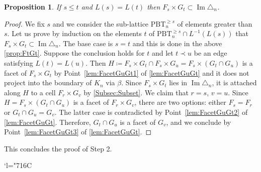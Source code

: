 \documentclass[JEP,XML,SOM,Unicode,NoFloatCountersInSection]{cedram}
\newcommand{\Changelback}{\mathcode`l="716C}
\theoremstyle{plain}
\newtheorem{proposition}{Proposition}
\theoremstyle{definition}
\newcommand{\K}{{K}}
\newcommand{\Tam}[1]{\mathrm{PBT}_{#1}}
\DeclareMathOperator{\im}{\mathrm{Im}}
\begin{document}
\begin{proposition}
If $s\leq t$ and $L(s) = L(t)$ then $F_s\times G_t\subset \im\triangle_n$.
\end{proposition}

\begin{proof}
We fix $s$ and we consider the sub-lattice $\Tam{n}^{\geq s}$ of elements greater than~$s$.
Let us prove by induction on the elements $t$ of $\Tam{n}^{\geq s}\cap L^{-1}(L(s))$ that
$F_s\times G_t\subset \im\triangle_n$.
The base case is $s=t$ and this is done in the above \cref{prop:FtGt}.
Suppose the conclusion holds for $t$ and let $t\prec u$ be an edge satisfying $L(t)= L(u)$.
Then $H \coloneqq F_s\times G_t\cap F_s\times G_u = F_s\times (G_t\cap G_u)$ is a facet of $F_s\times G_t$
by Point~\eqref{lem:FacetGuGt1} of \cref{lem:FacetGuGt} and it does not project into the boundary of $\K_n$ via $\beta$.
Since $F_s\times G_t$ lies in $\im\triangle_n$, it is attached along $H$ to a cell
$F_r\times G_v$ by \cref{Subsec:Subset}.
We claim that $r=s$, $v=u$.
Since $H=F_s\times (G_t\cap G_u)$ is a facet of $F_r\times G_v$, there are two options: either $F_s=F_r$ or $G_t\cap G_u=G_v$. The latter case is contradicted by Point~\eqref{lem:FacetGuGt2} of \cref{lem:FacetGuGt}.
Therefore, $G_t\cap G_u$ is a facet of $G_v$, and we conclude by
Point~\eqref{lem:FacetGuGt3} of \cref{lem:FacetGuGt}.
\end{proof}

This concludes the proof of Step 2.

\Changelback
\backmatter


\end{document}
